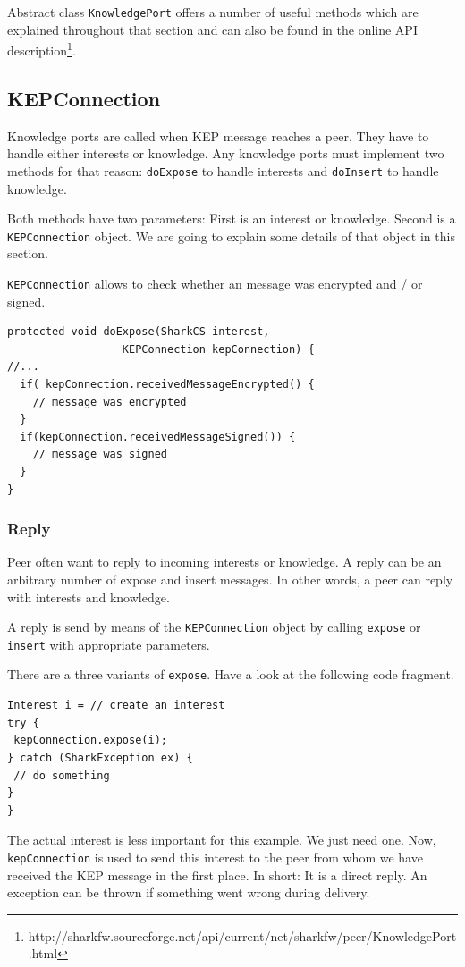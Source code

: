 Abstract class {\tt KnowledgePort} offers a number of useful methods which are explained throughout that section and can also be found in the online API description\footnote{http://sharkfw.sourceforge.net/api/current/net/sharkfw/peer/KnowledgePort.html}.

\subsection{KEPConnection}
Knowledge ports are called when KEP message reaches a peer. They have to handle either interests or knowledge. Any knowledge ports must implement two methods for that reason: {\tt doExpose} to handle interests and {\tt doInsert} to handle knowledge. 

Both methods have two parameters: First is an interest or knowledge. Second is a {\tt KEPConnection} object. We are going to explain some details of that object in this section.

{\tt KEPConnection} allows to check whether an message was encrypted and / or signed.

\begin{verbatim}
protected void doExpose(SharkCS interest, 
                  KEPConnection kepConnection) {
//...
  if( kepConnection.receivedMessageEncrypted() {
    // message was encrypted
  }
  if(kepConnection.receivedMessageSigned()) {
    // message was signed
  }
}
\end{verbatim}

\subsubsection{Reply}
Peer often want to reply to incoming interests or knowledge. A reply can be an arbitrary number of expose and insert messages. In other words, a peer can reply with interests and knowledge. 

A reply is send by means of the {\tt KEPConnection} object by calling {\tt expose} or {\tt insert} with appropriate parameters.

There are a three variants of {\tt expose}. Have a look at the following code fragment.

\begin{verbatim}
Interest i = // create an interest
try {
 kepConnection.expose(i);
} catch (SharkException ex) {
 // do something 
}
}
\end{verbatim}

The actual interest is less important for this example. We just need one. Now, {\tt kepConnection} is used to send this interest to the peer from whom we have received the KEP message in the first place. In short: It is a direct reply. An exception can be thrown if something went wrong during delivery.

